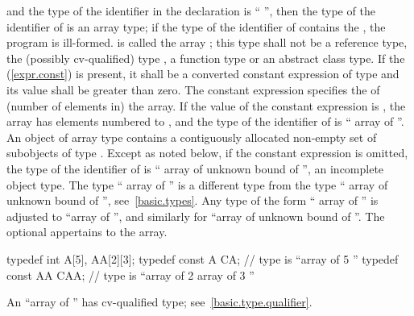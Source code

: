 and the type of the identifier in the declaration
is
``
'',
then the type of the identifier of
is an array type; if the type of the identifier of 
contains the  ,
the program is ill-formed.
is called the array
;
this type shall not be a reference type, the (possibly cv-qualified) type
,
a function type or an abstract class type.
%
If the
(\ref{expr.const}) is present, it shall be a converted constant
expression of type  and
its value shall be greater than zero.
The constant expression specifies the
%
%
of (number of elements in) the array.
If the value of the constant expression is
,
the array has
elements numbered
to
,
and the type of the identifier of
is `` array of
''.
An object of array type contains a contiguously allocated non-empty set of
subobjects of type
.
Except as noted below, if
the constant expression is omitted, the type of the identifier of
is `` array of unknown bound of
'',
an incomplete object type.
The type `` array of
''
is a different type from the type
`` array of unknown bound of
'',
see~\ref{basic.types}.
Any type of the form
`` array of
''
is adjusted to
``array of
'',
and similarly for
``array of unknown bound of
''.
The optional  appertains to the array.
\begin{example}

\begin{codeblock}
typedef int A[5], AA[2][3];
typedef const A CA;             // type is ``array of 5 ''
typedef const AA CAA;           // type is ``array of 2 array of 3 ''
\end{codeblock}
\end{example}
\begin{note}
An
``array of
''
has cv-qualified type; see~\ref{basic.type.qualifier}.
\end{note}

